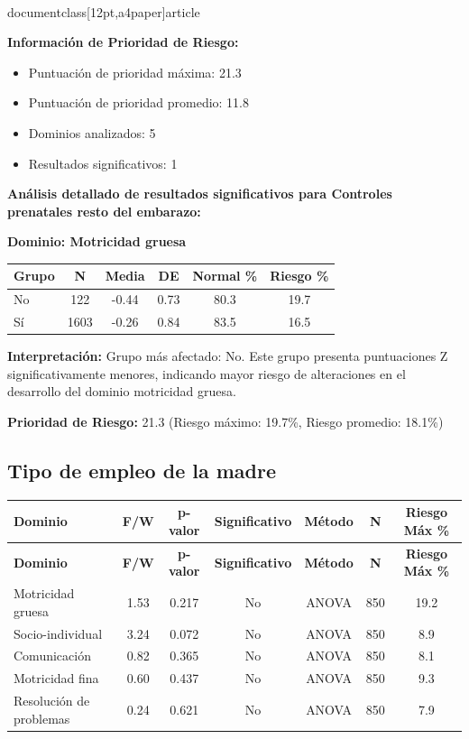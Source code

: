 \\documentclass[12pt,a4paper]{article}
\begin{document}
\textbf{Información de Prioridad de Riesgo:}
\begin{itemize}
\item Puntuación de prioridad máxima: 21.3
\item Puntuación de prioridad promedio: 11.8
\item Dominios analizados: 5
\item Resultados significativos: 1
\end{itemize}


\textbf{Análisis detallado de resultados significativos para Controles prenatales resto del embarazo:}


\textbf{Dominio: Motricidad gruesa}


\begin{center}
\begin{tabular}{|l|c|c|c|c|c|}
\hline
\textbf{Grupo} & \textbf{N} & \textbf{Media} & \textbf{DE} & \textbf{Normal \%} & \textbf{Riesgo \%} \\
\hline
No & 122 & -0.44 & 0.73 & 80.3 & 19.7 \\
Sí & 1603 & -0.26 & 0.84 & 83.5 & 16.5 \\

\hline
\end{tabular}
\end{center}


\textbf{Interpretación:} Grupo más afectado: No. Este grupo presenta puntuaciones Z significativamente menores, indicando mayor riesgo de alteraciones en el desarrollo del dominio motricidad gruesa.

\textbf{Prioridad de Riesgo:} 21.3 (Riesgo máximo: 19.7\%, Riesgo promedio: 18.1\%)


\vspace{0.5cm}


\subsection{Tipo de empleo de la madre}


\begin{longtable}{|l|c|c|c|c|c|c|}
\hline
\textbf{Dominio} & \textbf{F/W} & \textbf{p-valor} & \textbf{Significativo} & \textbf{Método} & \textbf{N} & \textbf{Riesgo Máx \%} \\
\hline
\endfirsthead

\hline
\textbf{Dominio} & \textbf{F/W} & \textbf{p-valor} & \textbf{Significativo} & \textbf{Método} & \textbf{N} & \textbf{Riesgo Máx \%} \\
\hline
\endhead

\hline
\endfoot

\hline
\endlastfoot

Motricidad gruesa & 1.53 & 0.217 & No & ANOVA & 850 & 19.2 \\
Socio-individual & 3.24 & 0.072 & No & ANOVA & 850 & 8.9 \\
Comunicación & 0.82 & 0.365 & No & ANOVA & 850 & 8.1 \\
Motricidad fina & 0.60 & 0.437 & No & ANOVA & 850 & 9.3 \\
Resolución de problemas & 0.24 & 0.621 & No & ANOVA & 850 & 7.9 \\

\end{longtable}
\end{document}

